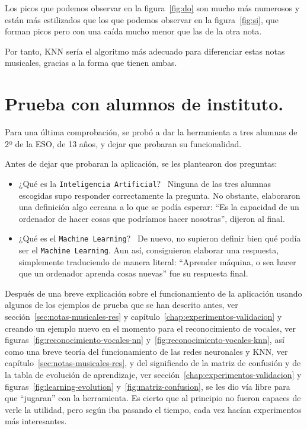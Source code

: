 \documentclass[a4paper, 12pt]{book}
\begin{document}
Los picos que podemos observar en la figura~\ref{fig:do} son mucho más numerosos y están más estilizados que los que podemos observar en la figura~\ref{fig:si}, que forman picos pero con una caída mucho menor que las de la otra nota.

Por tanto, KNN sería el algoritmo más adecuado para diferenciar estas notas musicales, gracias a la forma que tienen ambas.

\section{Prueba con alumnos de instituto.}
\label{sec:prueba}

Para una última comprobación, se probó a dar la herramienta a tres alumnas de 2º de la ESO, de 13 años, y dejar que probaran su funcionalidad.

Antes de dejar que probaran la aplicación, se les plantearon dos preguntas:

\begin{itemize}
	\item ¿Qué es la \texttt{Inteligencia Artificial}?~ Ninguna de las tres alumnas escogidas supo responder correctamente la pregunta. No obstante, elaboraron una definición algo cercana a lo que se podía esperar: ``Es la capacidad de un ordenador de hacer cosas que podríamos hacer nosotras'', dijeron al final.
	\item ¿Qué es el \texttt{Machine Learning}?~ De nuevo, no supieron definir bien qué podía ser el \texttt{Machine Learning}. Aun así, consiguieron elaborar una respuesta, simplemente traduciendo de manera literal: ``Aprender máquina, o sea hacer que un ordenador aprenda cosas nuevas'' fue su respuesta final.
\end{itemize}

Después de una breve explicación sobre el funcionamiento de la aplicación usando algunos de los ejemplos de prueba que se han descrito antes, ver sección~\ref{sec:notas-musicales-res} y capítulo~\ref{chap:experimentos-validacion} y creando un ejemplo nuevo en el momento para el reconocimiento de vocales, ver figuras~\ref{fig:reconocimiento-vocales-nn} y~\ref{fig:reconocimiento-vocales-knn}, así como una breve teoría del funcionamiento de las redes neuronales y KNN, ver capítulo~\ref{sec:notas-musicales-res}, y del significado de la matriz de confusión y de la tabla de evolución de aprendizaje, ver sección~\ref{chap:experimentos-validacion} y figuras~\ref{fig:learning-evolution} y~\ref{fig:matriz-confusion}, se les dio vía libre para que ``jugaran'' con la herramienta. Es cierto que al principio no fueron capaces de verle la utilidad, pero según iba pasando el tiempo, cada vez hacían experimentos más interesantes.
\end{document}
